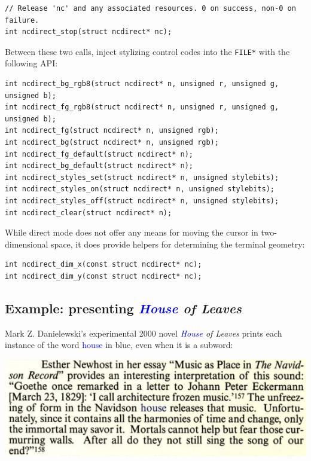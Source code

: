 \documentclass[letterpaper,10pt]{article}
\begin{document}
\begin{listing}[ht]
\begin{verbatim}
// Release 'nc' and any associated resources. 0 on success, non-0 on failure.
int ncdirect_stop(struct ncdirect* nc);
\end{verbatim}
\end{listing}

Between these two calls, inject stylizing control codes into the \texttt{FILE*} with
the following API:

\begin{listing}[ht]
\begin{verbatim}
int ncdirect_bg_rgb8(struct ncdirect* n, unsigned r, unsigned g, unsigned b);
int ncdirect_fg_rgb8(struct ncdirect* n, unsigned r, unsigned g, unsigned b);
int ncdirect_fg(struct ncdirect* n, unsigned rgb);
int ncdirect_bg(struct ncdirect* n, unsigned rgb);
int ncdirect_fg_default(struct ncdirect* n);
int ncdirect_bg_default(struct ncdirect* n);
int ncdirect_styles_set(struct ncdirect* n, unsigned stylebits);
int ncdirect_styles_on(struct ncdirect* n, unsigned stylebits);
int ncdirect_styles_off(struct ncdirect* n, unsigned stylebits);
int ncdirect_clear(struct ncdirect* n);
\end{verbatim}
\end{listing}

While direct mode does not offer any means for moving the cursor in
two-dimensional space, it does provide helpers for determining the terminal
geometry:

\begin{verbatim}
int ncdirect_dim_x(const struct ncdirect* nc);
int ncdirect_dim_y(const struct ncdirect* nc);
\end{verbatim}

\subsection{Example: presenting \textit{\textcolor{blue}{House} of Leaves}}

Mark Z. Danielewski's experimental 2000 novel \textit{\textcolor{blue}{House} of Leaves} prints each
instance of the word \textcolor{blue}{house} in blue, even when it is a subword:

\begin{center}
\includegraphics[width=.5\linewidth]{house-blue.png}
\end{center}
\end{document}
